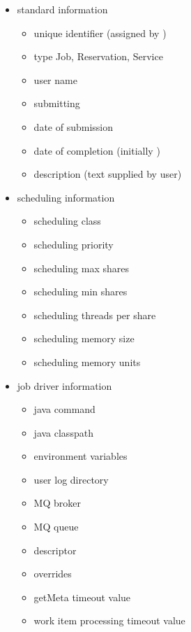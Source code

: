     \begin{itemize}
    
      \begin{itemize}
      \item standard information
        \begin{itemize}
          \item unique identifier (assigned by \varDUCC)
          \item type {Job, Reservation, Service}
          \item user name
          \item submitting \varPID
          \item date of submission
          \item date of completion (initially \varNull)
          \item description (text supplied by user)
        \end{itemize} 
      \item scheduling information
        \begin{itemize}
          \item scheduling class
          \item scheduling priority
          \item scheduling max shares
          \item scheduling min shares
          \item scheduling threads per share
          \item scheduling memory size
          \item scheduling memory units
        \end{itemize} 
      \item job driver information
        \begin{itemize}
          \item java command
          \item java classpath
          \item environment variables
          \item user log directory
          \item MQ broker
          \item MQ queue
          \item \varCollectionReader descriptor
          \item \varCollectionReader overrides
          \item getMeta timeout value
          \item work item processing timeout value

\end{itemize}
\end{itemize}
\end{itemize}
